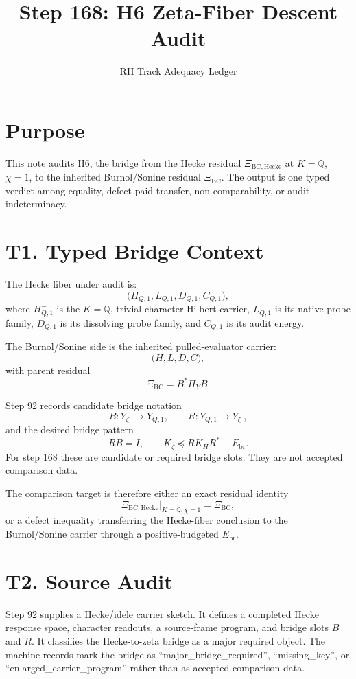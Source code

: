 \documentclass[11pt]{article}
\title{Step 168: H6 Zeta-Fiber Descent Audit}
\author{RH Track Adequacy Ledger}
\date{}
\newcommand{\XiBC}{\Xi_{\mathrm{BC}}}
\newcommand{\XiH}{\Xi_{\mathrm{BC,Hecke}}}
\newcommand{\Q}{\mathbb Q}
\newcommand{\HH}{H_{Q,1}^{-}}
\newcommand{\Yzeta}{Y_{\zeta}^{-}}
\newcommand{\YH}{Y_{Q,1}^{-}}
\begin{document}
\maketitle

\section{Purpose}

This note audits H6, the bridge from the Hecke residual \(\XiH\) at
\(K=\Q\), \(\chi=1\), to the inherited Burnol/Sonine residual \(\XiBC\).
The output is one typed verdict among equality, defect-paid transfer,
non-comparability, or audit indeterminacy.

\section{T1. Typed Bridge Context}

The Hecke fiber under audit is:
\[
  \bigl(\HH,L_{Q,1},D_{Q,1},C_{Q,1}\bigr),
\]
where \(\HH\) is the \(K=\Q\), trivial-character Hilbert carrier,
\(L_{Q,1}\) is its native probe family, \(D_{Q,1}\) is its dissolving probe
family, and \(C_{Q,1}\) is its audit energy.

The Burnol/Sonine side is the inherited pulled-evaluator carrier:
\[
  \bigl(H,L,D,C\bigr),
\]
with parent residual
\[
  \XiBC = B^* \Pi_Y B.
\]

Step 92 records candidate bridge notation
\[
  B:\Yzeta\to \YH,\qquad R:\YH\to \Yzeta,
\]
and the desired bridge pattern
\[
  RB=I,\qquad K_{\zeta}\preceq R K_H R^*+E_{\mathrm{br}}.
\]
For step 168 these are candidate or required bridge slots. They are not
accepted comparison data.

The comparison target is therefore either an exact residual identity
\[
  \XiH|_{K=\Q,\chi=1}=\XiBC,
\]
or a defect inequality transferring the Hecke-fiber conclusion to the
Burnol/Sonine carrier through a positive-budgeted \(E_{\mathrm{br}}\).

\section{T2. Source Audit}

Step 92 supplies a Hecke/idele carrier sketch. It defines a completed
Hecke response space, character readouts, a source-frame program, and
bridge slots \(B\) and \(R\). It classifies the Hecke-to-zeta bridge as a
major required object. The machine records mark the bridge as
``major\_bridge\_required'', ``missing\_key'', or
``enlarged\_carrier\_program'' rather than as accepted comparison data.
\end{document}
